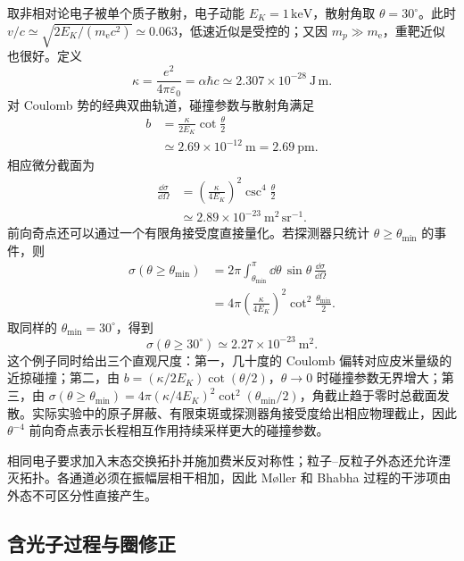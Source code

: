 \begin{exbox}
取非相对论电子被单个质子散射，电子动能 $E_K=1\,\mathrm{keV}$，散射角取 $\theta=30^\circ$。此时 $v/c\simeq\sqrt{2E_K/(m_{\mathrm e} c^2)}\simeq0.063$，低速近似是受控的；又因 $m_p\gg m_{\mathrm e}$，重靶近似也很好。定义
\begin{equation*}
 \kappa=\frac{e^2}{4\pi\varepsilon_0}=\alpha\hbar c
 \simeq2.307\times10^{-28}\ \mathrm{J\,m}.
\end{equation*}
对 Coulomb 势的经典双曲轨道，碰撞参数与散射角满足
\begin{align*}
 b
 &=\frac{\kappa}{2E_K}\cot\frac\theta2\\
 &\simeq2.69\times10^{-12}\ \mathrm m
 =2.69\ \mathrm{pm}.
\end{align*}
相应微分截面为
\begin{align*}
 \frac{\dd\sigma}{\dd\Omega}
 &=\left(\frac{\kappa}{4E_K}\right)^2
 \csc^4\frac\theta2\\
 &\simeq2.89\times10^{-23}\ \mathrm{m^2\,sr^{-1}}.
\end{align*}
前向奇点还可以通过一个有限角接受度直接量化。若探测器只统计 $\theta\ge\theta_{\min}$ 的事件，则
\begin{align*}
 \sigma(\theta\ge\theta_{\min})
 &=2\pi\int_{\theta_{\min}}^\pi
   \dd\theta\,\sin\theta\,
   \frac{\dd\sigma}{\dd\Omega}\\
 &=4\pi\left(\frac{\kappa}{4E_K}\right)^2
   \cot^2\frac{\theta_{\min}}2.
\end{align*}
取同样的 $\theta_{\min}=30^\circ$，得到
\[
 \sigma(\theta\ge30^\circ)
 \simeq2.27\times10^{-23}\ \mathrm m^2.
\]
这个例子同时给出三个直观尺度：第一，几十度的 Coulomb 偏转对应皮米量级的近掠碰撞；第二，由 $b=(\kappa/2E_K)\cot(\theta/2)$，$\theta\to0$ 时碰撞参数无界增大；第三，由 $\sigma(\theta\ge\theta_{\min})=4\pi(\kappa/4E_K)^2\cot^2(\theta_{\min}/2)$，角截止趋于零时总截面发散。实际实验中的原子屏蔽、有限束斑或探测器角接受度给出相应物理截止，因此 $\theta^{-4}$ 前向奇点表示长程相互作用持续采样更大的碰撞参数。
\end{exbox}

相同电子要求加入末态交换拓扑并施加费米反对称性；粒子--反粒子外态还允许湮灭拓扑。各通道必须在振幅层相干相加，因此 M{\o}ller 和 Bhabha 过程的干涉项由外态不可区分性直接产生。





\subsection{含光子过程与圈修正}

